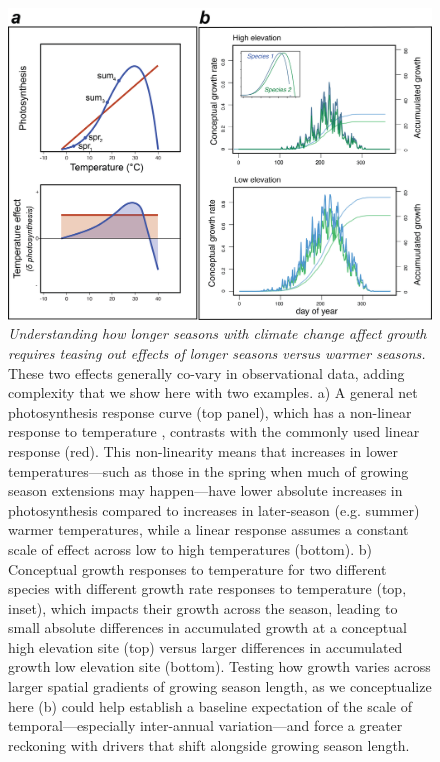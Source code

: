 \documentclass[11pt]{article}
\begin{document}
\clearpage
\begin{figure}[h!]
\includegraphics[width=1\textwidth]{..//figures/elevationconcept/elevationrateswtempresponse.png}
\caption{\emph{Understanding how longer seasons with climate change affect growth requires teasing out effects of longer seasons versus warmer seasons.} These two effects generally co-vary in observational data, adding complexity that we show here with two examples. a) A general net photosynthesis response curve (top panel), which has a non-linear response to temperature  \citep[blue curve, adapted from meta-analysis of][]{rezende2019thermal}, contrasts with the commonly used linear response (red). This non-linearity means that increases in lower temperatures---such as those in the spring when much of growing season extensions may happen---have lower absolute increases in photosynthesis compared to increases in later-season (e.g. summer) warmer temperatures, while a linear response assumes a constant scale of effect across low to high temperatures (bottom). b) Conceptual growth responses to temperature for two different species with different growth rate responses to temperature (top, inset), which impacts their growth across the season, leading to small absolute differences in accumulated growth at a conceptual high elevation site (top) versus larger differences in accumulated growth low elevation site (bottom). Testing how growth varies across larger spatial gradients of growing season length, as we conceptualize here (b) could help establish a baseline expectation of the scale of temporal---especially inter-annual variation---and force a greater reckoning with drivers that shift alongside growing season length.}

\end{figure}
\end{document}
